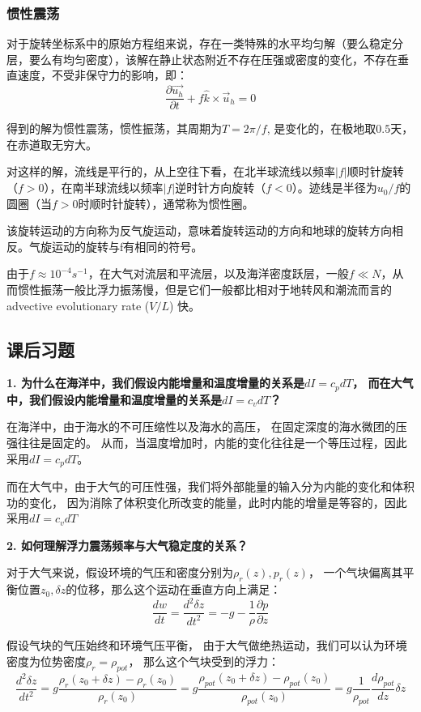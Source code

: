\documentclass{article}
\begin{document}
\subsubsection{惯性震荡}
对于旋转坐标系中的原始方程组来说，存在一类特殊的水平均匀解（要么稳定分层，要么有均匀密度），该解在静止状态附近不存在压强或密度的变化，不存在垂直速度，不受非保守力的影响，即：
$$\frac{\partial \vec{u_h}}{\partial t} + f\hat{k}\times\vec{u}_h = 0$$

得到的解为惯性震荡，惯性振荡，其周期为$T=2\pi/f$, 是变化的，在极地取$0.5$天，在赤道取无穷大。

对这样的解，流线是平行的，从上空往下看，在北半球流线以频率$|f|$顺时针旋转（$f>0$），在南半球流线以频率$|f|$逆时针方向旋转（$f<0$）。迹线是半径为$u_0/f$的圆圈（当$f>0$时顺时针旋转），通常称为惯性圈。

该旋转运动的方向称为反气旋运动，意味着旋转运动的方向和地球的旋转方向相反。气旋运动的旋转与f有相同的符号。

由于$f\approx10^{-4}s^{-1}$，在大气对流层和平流层，以及海洋密度跃层，一般$f \ll N$，从而惯性振荡一般比浮力振荡慢，但是它们一般都比相对于地转风和潮流而言的 advective evolutionary rate ($V/L$) 快。

\subsection{课后习题}
\textbf{1. 为什么在海洋中，我们假设内能增量和温度增量的关系是$dI = c_pdT$，
而在大气中，我们假设内能增量和温度增量的关系是$dI = c_vdT$？}

在海洋中，由于海水的不可压缩性以及海水的高压，
在固定深度的海水微团的压强往往是固定的。
从而，当温度增加时，内能的变化往往是一个等压过程，因此采用$dI = c_pdT$。

而在大气中，由于大气的可压性强，我们将外部能量的输入分为内能的变化和体积功的变化，
因为消除了体积变化所改变的能量，此时内能的增量是等容的，因此采用$dI = c_vdT$

\textbf{2. 如何理解浮力震荡频率与大气稳定度的关系？}

对于大气来说，假设环境的气压和密度分别为$\rho_r(z), p_r(z)$，
一个气块偏离其平衡位置$z_0, \delta z$的位移，那么这个运动在垂直方向上满足：
$$\frac{dw}{dt}=\frac{d^2\delta z}{dt^2}
=-g-\frac{1}{\rho}\frac{\partial p}{\partial z}$$

假设气块的气压始终和环境气压平衡，
由于大气做绝热运动，我们可以认为环境密度为位势密度$\rho_r = \rho_{pot}$，
那么这个气块受到的浮力：
$$\frac{d^2\delta z}{dt^2}
=g\frac{\rho_r(z_0+\delta z)-\rho_r(z_0)}{\rho_r(z_0)}
=g\frac{\rho_{pot}(z_0+\delta z)-\rho_{pot}(z_0)}{\rho_{pot}(z_0)}
=g\frac{1}{\rho_{pot}}\frac{d\rho_{pot}}{dz}\delta z$$
\end{document}
